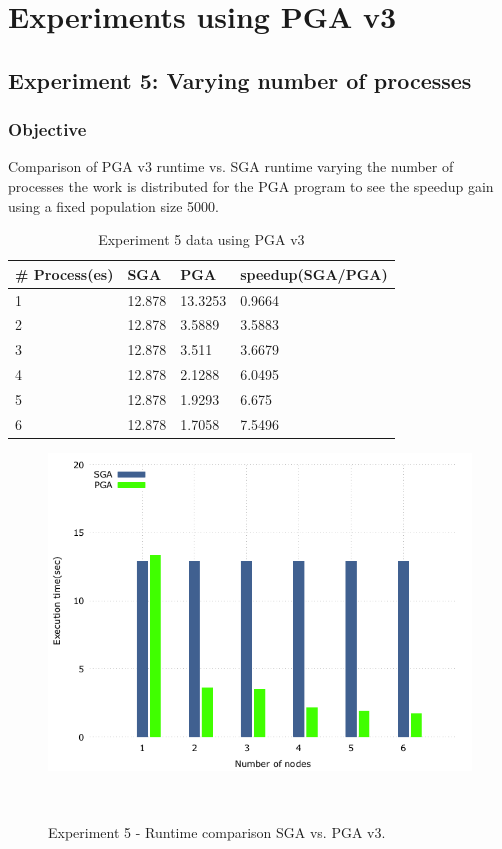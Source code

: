 \section{Experiments using PGA v3}

\subsection{Experiment 5: Varying number of processes}

\subsubsection{Objective}
Comparison of PGA v3 runtime vs. SGA runtime varying the number of processes the work is distributed for the PGA program to see the speedup gain using a fixed population size 5000.

\begin{table}[H]
\centering
\caption{Experiment 5 data using PGA v3}
\label{tab:pga3_node}
\begin{tabular}{|l|l|l|l|}
\hline
\# Process(es) & SGA    & PGA     & speedup(SGA/PGA) \\ \hline
1        & 12.878 & 13.3253 & 0.9664           \\ \hline
2        & 12.878 & 3.5889  & 3.5883           \\ \hline
3        & 12.878 & 3.511   & 3.6679           \\ \hline
4        & 12.878 & 2.1288  & 6.0495           \\ \hline
5        & 12.878 & 1.9293  & 6.675            \\ \hline
6        & 12.878 & 1.7058  & 7.5496           \\ \hline
\end{tabular}
\end{table}


\begin{figure}[H]
\begin{center}
  \includegraphics[width=.7 \linewidth]{stats_data_new/graphs/pga_partial_xNodes_hist.png}
  \caption{Experiment 5 - Runtime comparison SGA vs. PGA v3.}
  \end{center}\
\end{figure}

